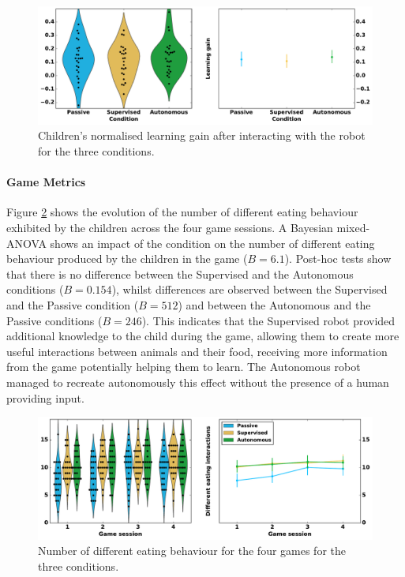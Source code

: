 \begin{figure}[ht]
	\includegraphics[width=1\linewidth]{learning.pdf}
	\centering
	\caption{Children's normalised learning gain after interacting with the robot for the three conditions.}
	\label{fig:learning}
\end{figure}

\paragraph{Game Metrics}

Figure \ref{fig:d_eat} shows the evolution of the number of different eating behaviour exhibited by the children across the four game sessions. A Bayesian mixed-ANOVA shows an impact of the condition on the number of different eating behaviour produced by the children in the game ($B=6.1$). Post-hoc tests show that there is no difference between the Supervised and the Autonomous conditions ($B=0.154$), whilst differences are observed between the Supervised and the Passive condition ($B=512$) and between the Autonomous and the Passive conditions ($B=246$). This indicates that the Supervised robot provided additional knowledge to the child during the game, allowing them to create more useful interactions between animals and their food, receiving more information from the game potentially helping them to learn. The Autonomous robot managed to recreate autonomously this effect without the presence of a human providing input.

\begin{figure}[ht]
	\includegraphics[width=1\linewidth]{d_eat.pdf}
	\centering
	\caption{Number of different eating behaviour for the four games for the three conditions.}
	\label{fig:d_eat}
\end{figure}

